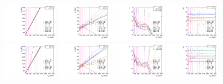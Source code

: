 \begin{figure}[htbp]
  \centering
  \includegraphics[width=0.2\textwidth]{fig/2Dfit/paramSignalShape_allSig_MVV_HP_bb_HDy_MEAN.pdf}
  \includegraphics[width=0.2\textwidth]{fig/2Dfit/paramSignalShape_allSig_MVV_HP_bb_HDy_SIGMA.pdf}
  \includegraphics[width=0.2\textwidth]{fig/2Dfit/paramSignalShape_allSig_MVV_HP_bb_HDy_ALPHA1.pdf}
  \includegraphics[width=0.2\textwidth]{fig/2Dfit/paramSignalShape_allSig_MVV_HP_bb_HDy_ALPHA2.pdf}\\
  \includegraphics[width=0.2\textwidth]{fig/2Dfit/paramSignalShape_allSig_MVV_LP_bb_HDy_MEAN.pdf}
  \includegraphics[width=0.2\textwidth]{fig/2Dfit/paramSignalShape_allSig_MVV_LP_bb_HDy_SIGMA.pdf}
  \includegraphics[width=0.2\textwidth]{fig/2Dfit/paramSignalShape_allSig_MVV_LP_bb_HDy_ALPHA1.pdf}
  \includegraphics[width=0.2\textwidth]{fig/2Dfit/paramSignalShape_allSig_MVV_LP_bb_HDy_ALPHA2.pdf}\\

\end{figure}
